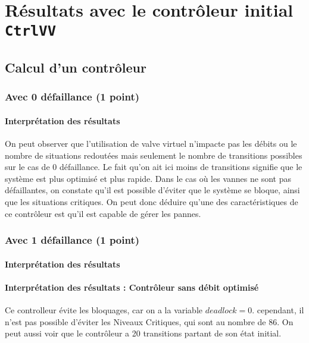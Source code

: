 \documentclass[a4paper]{book}
\begin{document}
\section{Résultats avec le contrôleur initial {\tt CtrlVV}}
\subsection{Calcul d'un contrôleur}
\subsubsection{Avec 0 défaillance (1 point)}


%
%
%
\paragraph{Interprétation des résultats}

On peut observer que l'utilisation de valve virtuel n'impacte pas les débits ou le nombre de situations redoutées mais seulement le nombre de transitions possibles sur le cas de 0 défaillance.
Le fait qu'on ait ici moins de transitions signifie que le système est plus optimisé et plus rapide.
Dans le cas où les vannes ne sont pas défaillantes, on constate qu’il est possible d’éviter que le système se bloque, ainsi que les situations critiques.
On peut donc déduire qu’une des caractéristiques de ce contrôleur est qu’il est capable de gérer les pannes.

\subsubsection{Avec 1 défaillance (1 point)}


%
%
%
\paragraph{Interprétation des résultats}
\paragraph{Interprétation des résultats : Contrôleur sans débit optimisé}
Ce controlleur évite les bloquages, car on a la variable $deadlock = 0$. cependant, il n'est pas possible d'éviter les Niveaux Critiques, qui sont au nombre de 86.
On peut aussi voir que le contrôleur a 20 transitions partant de son état initial.
\end{document}

